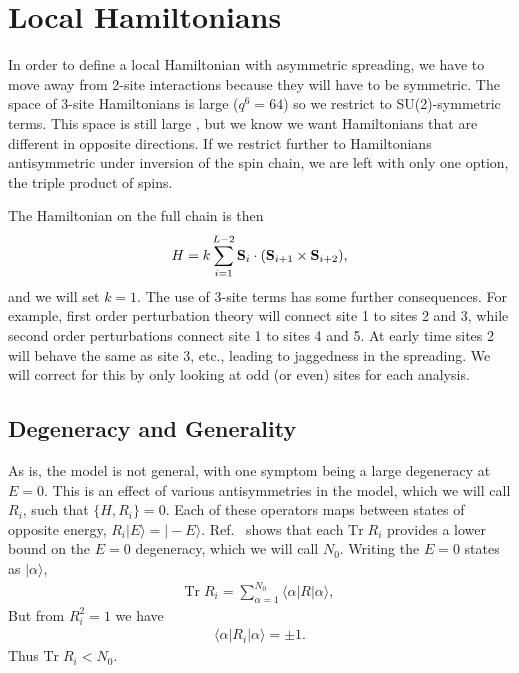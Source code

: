 \documentclass[aps,prx,reprint,superscriptaddress, longbibliography]{revtex4-1}
\newcommand{\charlie}[1]{{\color{Magenta}{{#1}}}}
\newcommand{\Tr}{ \mbox{Tr}}
\begin{document}
\tableofcontents

\section{Local Hamiltonians}

In order to define a local Hamiltonian with asymmetric spreading, we have to move away from 2-site interactions because they will have to be symmetric. The space of 3-site Hamiltonians is large ($q^{6} = 64$) so we restrict to SU(2)-symmetric terms. This space is still large \charlie{Does it matter how large?}, but we know we want Hamiltonians that are different in opposite directions. If we restrict further to Hamiltonians antisymmetric under inversion of the spin chain, we are left with only one option, the triple product of spins.

 The Hamiltonian on the full chain is then
\begin{align}
H = k\sum_{i=1}^{L-2}{\bf S}_i\cdot({\bf S}_{i+1}\times {\bf S}_{i+2}),\nonumber
\end{align}
and we will set $k=1$.
The use of 3-site terms has some further consequences. For example, first order perturbation theory will connect site 1 to sites 2 and 3, while second order perturbations connect site 1 to sites 4 and 5. At early time sites 2 will behave the same as site 3, etc., leading to jaggedness in the spreading.
We will correct for this by only looking at odd (or even) sites for each analysis.

\subsection{Degeneracy and Generality}

As is, the model is not general, with one symptom being a large degeneracy at $E=0$. This is an effect of various antisymmetries in the model, which we will call $R_i$, such that $\{H, R_i\}=0$. Each of these operators maps between states of opposite energy, $R_i|E\rangle = |-E\rangle$. Ref.~\cite{IadecolaFSUSY} shows that each $\Tr\;R_i$ provides a lower bound on the $E=0$ degeneracy, which we will call $N_0$. Writing the $E=0$ states as $|\alpha\rangle$,
\begin{align}
\Tr\;R_i = \sum_{\alpha=1}^{N_0}\langle\alpha|R|\alpha\rangle,
\end{align}
But from $R_i^2=1$ we have
\begin{align}
\langle\alpha|R_i|\alpha\rangle=\pm 1.
\end{align}
Thus $\Tr\; R_i < N_0$.
\end{document}
